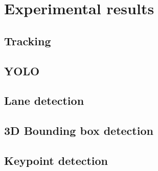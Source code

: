 \chapter{Experimental results}
\label{chap:experimental}
\section{Tracking}
\section{YOLO}
\section{Lane detection}
\section{3D Bounding box detection}
\section{Keypoint detection}
